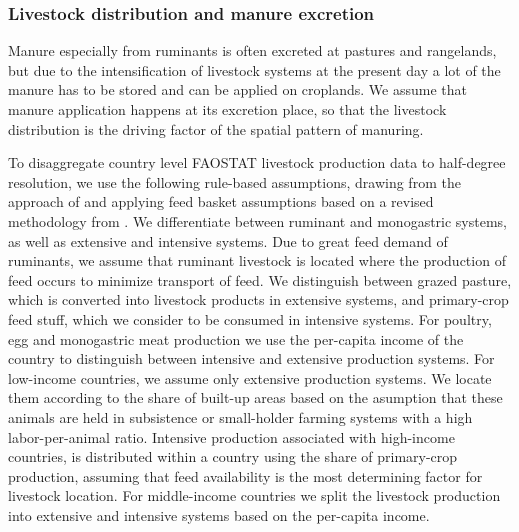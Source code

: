\documentclass[gc, manuscript]{copernicus}
\begin{document}
\hypertarget{sec:livstmanure}{%
\subsubsection{Livestock distribution and manure excretion}\label{sec:livstmanure}}

Manure especially from ruminants is often excreted at pastures and rangelands, but due to the intensification of livestock systems at the present day a lot of the manure has to be stored and can be applied on croplands. We assume that manure application happens at its excretion place, so that the livestock distribution is the driving factor of the spatial pattern of manuring.

To disaggregate country level FAOSTAT livestock production data to half-degree resolution, we use the following rule-based assumptions, drawing from the approach of \citep{robinson_mapping_2014} and applying feed basket assumptions based on a revised methodology from \citep{weindl_livestock_2017}. We differentiate between ruminant and monogastric systems, as well as extensive and intensive systems.
Due to great feed demand of ruminants, we assume that ruminant livestock is located where the production of feed occurs to minimize transport of feed. We distinguish between grazed pasture, which is converted into livestock products in extensive systems, and primary-crop feed stuff, which we consider to be consumed in intensive systems.
For poultry, egg and monogastric meat production we use the per-capita income of the country to distinguish between intensive and extensive production systems. For low-income countries, we assume only extensive production systems. We locate them according to the share of built-up areas based on the asumption that these animals are held in subsistence or small-holder farming systems with a high labor-per-animal ratio. Intensive production associated with high-income countries, is distributed within a country using the share of primary-crop production, assuming that feed availability is the most determining factor for livestock location. For middle-income countries we split the livestock production into extensive and intensive systems based on the per-capita income.
\end{document}
